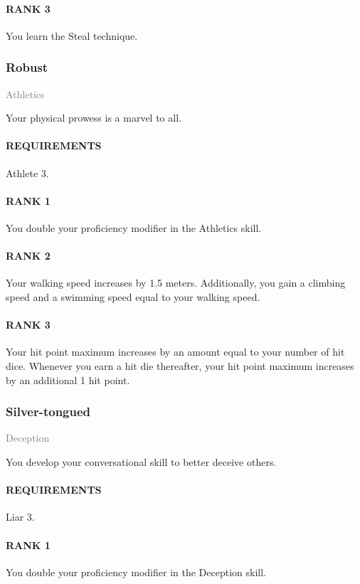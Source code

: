 \paragraph{RANK 3} You learn the Steal technique.

\subsubsection{Robust} \label{feat::robust}
\small \textcolor{gray}{Athletics}

\normalsize
Your physical prowess is a marvel to all.
\paragraph{REQUIREMENTS} Athlete 3.
\paragraph{RANK 1} You double your proficiency modifier in the Athletics skill.
\paragraph{RANK 2} Your walking speed increases by 1.5 meters.
Additionally, you gain a climbing speed and a swimming speed equal to your walking speed.
\paragraph{RANK 3} Your hit point maximum increases by an amount equal to your number of hit dice.
Whenever you earn a hit die thereafter, your hit point maximum increases by an additional 1 hit point.

\subsubsection{Silver-tongued} \label{feat::silvertongued}
\small{\textcolor{gray}{Deception}}

\normalsize
You develop your conversational skill to better deceive others.
\paragraph{REQUIREMENTS} Liar 3.
\paragraph{RANK 1} You double your proficiency modifier in the Deception skill.
